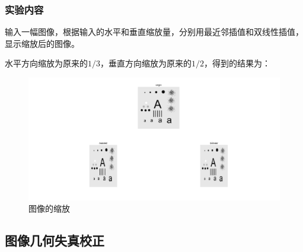 \documentclass{ctexart}
\begin{document}
\subsubsection{\hei 实验内容}
输入一幅图像，根据输入的水平和垂直缩放量，分别用最近邻插值和双线性插值，
显示缩放后的图像。
\par 水平方向缩放为原来的$1/3$，垂直方向缩放为原来的$1/2$，得到的结果为：
\begin{figure}[H]
    \centering
    \includegraphics[scale=0.3]{1_3.png}
    \caption{图像的缩放}
\end{figure}
\subsection{\hei 图像几何失真校正}
\end{document}
